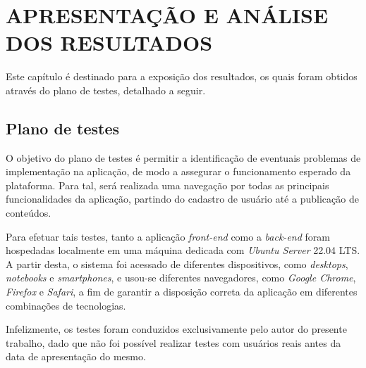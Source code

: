 
\section{APRESENTAÇÃO E ANÁLISE DOS RESULTADOS}



Este capítulo é destinado para a exposição dos resultados, os quais foram obtidos através do plano de testes, detalhado a seguir.

\subsection{Plano de testes}
O objetivo do plano de testes é permitir a identificação de eventuais problemas de implementação na aplicação, de modo a assegurar o funcionamento esperado da plataforma. Para tal, será realizada uma navegação por todas as principais funcionalidades da aplicação, partindo do cadastro de usuário até a publicação de conteúdos.

Para efetuar tais testes, tanto a aplicação \textit{front-end} como a \textit{back-end} foram hospedadas localmente em uma máquina dedicada com \textit{Ubuntu Server} 22.04 LTS. A partir desta, o sistema foi acessado de diferentes dispositivos, como \textit{desktops}, \textit{notebooks} e \textit{smartphones}, e usou-se  diferentes navegadores, como \textit{Google Chrome}, \textit{Firefox} e \textit{Safari}, a fim de garantir a disposição correta da aplicação em diferentes combinações de tecnologias.

Infelizmente, os testes foram conduzidos exclusivamente pelo autor do presente trabalho, dado que não foi possível realizar testes com usuários reais antes da data de apresentação do mesmo.

